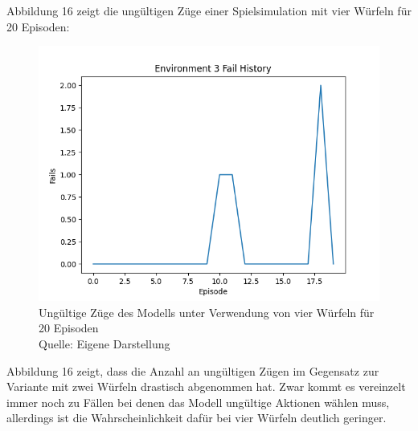 Abbildung 16 zeigt die ungültigen Züge einer Spielsimulation mit vier Würfeln für 20 Episoden:
\nopagebreak
\begin{figure}[H]
	\includegraphics[width=1\textwidth]{Bilder/failswithfourdice} 
	\caption[Ungültige Züge des Modells unter Verwendung von vier Würfeln für 20 Episoden]{Ungültige Züge des Modells unter Verwendung von vier Würfeln für 20 Episoden\\ Quelle: Eigene Darstellung}
\end{figure}

Abbildung 16 zeigt, dass die Anzahl an ungültigen Zügen im Gegensatz zur Variante mit zwei Würfeln drastisch abgenommen hat. Zwar kommt es vereinzelt immer noch zu Fällen bei denen das Modell ungültige Aktionen wählen muss, allerdings ist die Wahrscheinlichkeit dafür bei vier Würfeln deutlich geringer.
